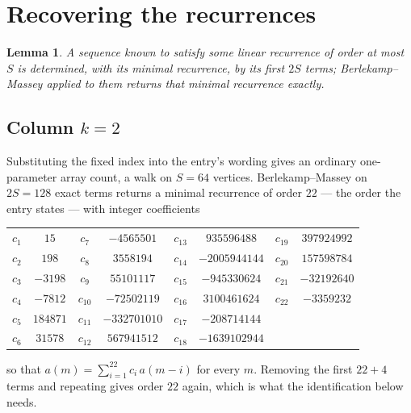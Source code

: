 \documentclass[11pt,a4paper]{article}
\theoremstyle{plain}
\newtheorem{lemma}[theorem]{Lemma}
\theoremstyle{definition}
\begin{document}
\section{Recovering the recurrences}

\begin{lemma}\label{lem:bm}
A sequence known to satisfy some linear recurrence of order at most $S$ is determined, with its
minimal recurrence, by its first $2S$ terms; Berlekamp--Massey applied to them returns that
minimal recurrence exactly.
\end{lemma}

\subsection*{Column $k=2$}
Substituting the fixed index into the entry's wording gives an ordinary one-parameter array
count, a walk on $S=64$ vertices. Berlekamp--Massey on $2S=128$ exact terms
returns a minimal recurrence of order $22$ --- the order the entry states --- with
integer coefficients
\begin{center}\small\begin{tabular}{cccccccc}
$c_{1}$ & $15$ & $c_{7}$ & $-4565501$ & $c_{13}$ & $935596488$ & $c_{19}$ & $397924992$ \\
$c_{2}$ & $198$ & $c_{8}$ & $3558194$ & $c_{14}$ & $-2005944144$ & $c_{20}$ & $157598784$ \\
$c_{3}$ & $-3198$ & $c_{9}$ & $55101117$ & $c_{15}$ & $-945330624$ & $c_{21}$ & $-32192640$ \\
$c_{4}$ & $-7812$ & $c_{10}$ & $-72502119$ & $c_{16}$ & $3100461624$ & $c_{22}$ & $-3359232$ \\
$c_{5}$ & $184871$ & $c_{11}$ & $-332701010$ & $c_{17}$ & $-208714144$ &  &  \\
$c_{6}$ & $31578$ & $c_{12}$ & $567941512$ & $c_{18}$ & $-1639102944$ &  &  \\
\end{tabular}\end{center}
so that $a(m)=\sum_{i=1}^{22}c_i\,a(m-i)$ for every $m$. Removing the first
$22+4$ terms and repeating gives order $22$ again, which is what the
identification below needs.
\end{document}
